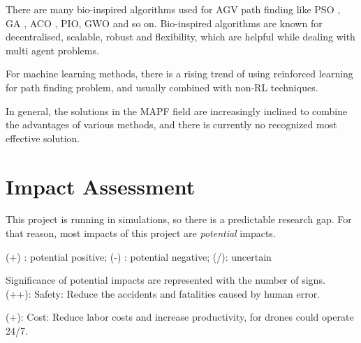\documentclass[12pt, oneside]{article}
\begin{document}
There are many bio-inspired algorithms used for AGV path finding like PSO \cite{PSO_1}\cite{PSO_2}, GA \cite{GA_1}\cite{GA_2}, ACO \cite{ACO_1}\cite{ACO_2}, PIO\cite{PIO_1}\cite{PIO_2}, GWO \cite{GWO_1}\cite{GWO_2} and so on. Bio-inspired algorithms are known for decentralised, scalable, robust and flexibility, which are helpful while dealing with multi agent problems.

For machine learning methods, there is a rising trend of using reinforced learning for path finding problem\cite{RL_3}\cite{RL_2}, and usually combined with non-RL techniques\cite{RL_1}\cite{RL_2}.

In general, the solutions in the MAPF field are increasingly inclined to combine the advantages of various methods\cite{MAPF_mixing}, and there is currently no recognized most effective solution.








\section{Impact Assessment}

This project is running in simulations, so there is a predictable research gap. For that reason, most impacts of this project are \textit{potential} impacts.

(+) : potential positive; (-) : potential negative;  (/): uncertain

Significance of potential impacts are represented with the number of signs.
\\



(++): Safety: Reduce the accidents and fatalities caused by human error.

(+):  Cost: Reduce labor costs and increase productivity, for drones could operate 24/7.
\end{document}
